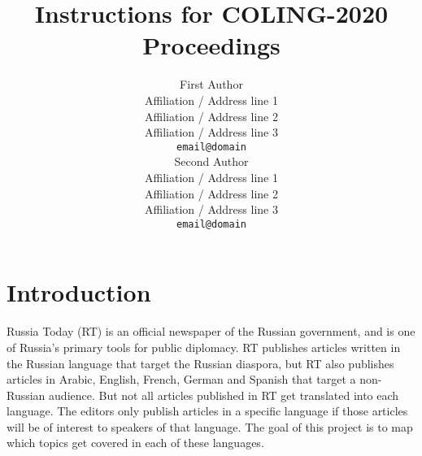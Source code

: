 \documentclass[11pt]{article}
\title{Instructions for COLING-2020 Proceedings}
\author{First Author \\
  Affiliation / Address line 1 \\
  Affiliation / Address line 2 \\
  Affiliation / Address line 3 \\
  {\tt email@domain} \\\And
  Second Author \\
  Affiliation / Address line 1 \\
  Affiliation / Address line 2 \\
  Affiliation / Address line 3 \\
  {\tt email@domain} \\}
\date{}
\newcommand{\fixme}[1]{\textbf{FIXME: {#1}}}
\begin{document}
\maketitle
\begin{abstract}
\end{abstract}

%
% 

\section{Introduction}
\label{sec:intro}

Russia Today (RT) is an official newspaper of the Russian government,
and is one of Russia's primary tools for public diplomacy.
RT publishes articles written in the Russian language that target the Russian diaspora,
but RT also publishes articles in Arabic, English, French, German and Spanish that target a non-Russian audience.
But not all articles published in RT get translated into each language.
The editors only publish articles in a specific language if those articles will be of interest to speakers of that language.
The goal of this project is to map which topics get covered in each of these languages.

\end{document}
